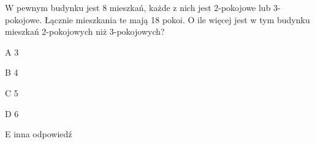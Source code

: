 \begin{tresc}
W pewnym budynku jest 8 mieszkań, każde z nich jest 2-pokojowe lub 3-pokojowe. Łącznie mieszkania te mają 18 pokoi. O ile więcej jest w tym budynku mieszkań 2-pokojowych niż 3-pokojowych?
\end{tresc}
\begin{wariant}{A} 3 \end{wariant}
\begin{wariant}{B} 4 \end{wariant}
\begin{wariant}{C} 5 \end{wariant}
\begin{wariant}{D} 6 \end{wariant}
\begin{wariant}{E} inna odpowiedź \end{wariant}
